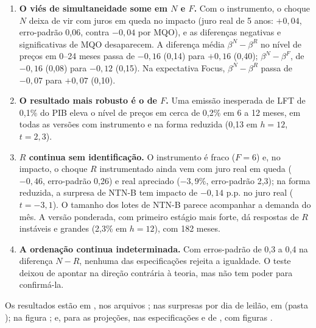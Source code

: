 \documentclass[12pt,a4paper]{article}
\begin{document}
\begin{enumerate}[leftmargin=1.2cm]
    \item \textbf{O viés de simultaneidade some em \(N\) e \(F\).} Com o instrumento, o
    choque \(N\) deixa de vir com juros em queda no impacto (juro real de 5 anos:
    \(+0{,}04\), erro-padrão 0,06, contra \(-0{,}04\) por MQO), e as diferenças negativas
    e significativas de MQO desaparecem. A diferença média \(\beta^N-\beta^R\) no
    nível de preços em 0--24 meses passa de \(-0{,}16\) (0,14) para \(+0{,}16\) (0,40);
    \(\beta^N-\beta^F\), de \(-0{,}16\) (0,08) para \(-0{,}12\) (0,15). Na expectativa
    Focus, \(\beta^N-\beta^R\) passa de \(-0{,}07\) para \(+0{,}07\) (0,10).
    \item \textbf{O resultado mais robusto é o de \(F\).} Uma emissão inesperada de
    LFT de 0,1\% do PIB eleva o nível de preços em cerca de 0,2\% em 6 a 12 meses, em
    todas as versões com instrumento e na forma reduzida (0,13 em \(h=12\), \(t=2{,}3\)).
    \item \textbf{\(R\) continua sem identificação.} O instrumento é fraco (\(F=6\)) e, no
    impacto, o choque \(R\) instrumentado ainda vem com juro real em queda
    (\(-0{,}46\), erro-padrão 0,26) e real apreciado (\(-3{,}9\%\), erro-padrão 2,3); na
    forma reduzida, a surpresa de NTN-B tem impacto de \(-0{,}14\) p.p. no juro real
    (\(t=-3{,}1\)). O tamanho dos lotes de NTN-B parece acompanhar a demanda do mês. A
    versão ponderada, com primeiro estágio mais forte, dá respostas de \(R\)
    instáveis e grandes (2,3\% em \(h=12\)), com 182 meses.
    \item \textbf{A ordenação continua indeterminada.} Com erros-padrão de 0,3 a 0,4
    na diferença \(N-R\), nenhuma das especificações rejeita a igualdade. O teste
    deixou de apontar na direção contrária à teoria, mas não tem poder para
    confirmá-la.
\end{enumerate}
\begin{sloppypar}
Os resultados estão em , nos arquivos
;
nas surpresas por dia de leilão, em  (pasta
); na figura
; e, para as projeções, nas especificações
 e  de , com
figuras .
\end{sloppypar}
\end{document}
